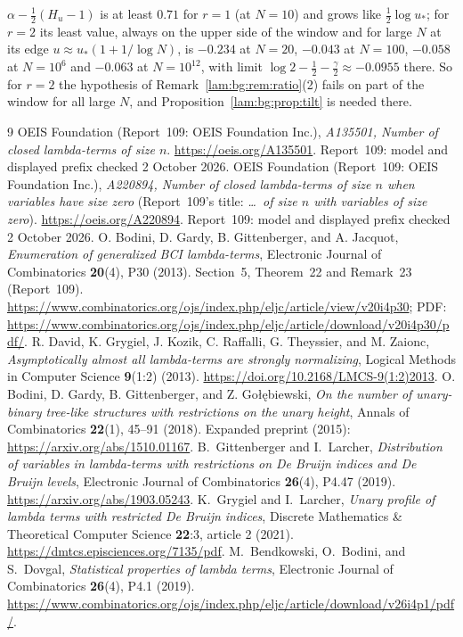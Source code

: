 \documentclass[11pt,a4paper]{article}
\numberwithin{equation}{section}
\theoremstyle{remark}
\begin{document}
$\alpha-\frac12(H_u-1)$ is at least $0.71$ for $r=1$ (at $N=10$) and grows like $\frac12\log u_*$; for $r=2$ its least value, always on the upper side of the window and for large $N$ at its edge $u\approx u_*(1+1/\log N)$, is $-0.234$ at $N=20$, $-0.043$ at $N=100$, $-0.058$ at $N=10^6$ and $-0.063$ at $N=10^{12}$, with limit $\log2-\frac12-\frac\gamma2\approx-0.0955$ there. So for $r=2$ the hypothesis of Remark~\ref{lam:bg:rem:ratio}(2) fails on part of the window for all large $N$, and Proposition~\ref{lam:bg:prop:tilt} is needed there.

\clearpage
\begin{thebibliography}{9}
 OEIS Foundation (Report~109: OEIS Foundation Inc.), \emph{A135501, Number of closed lambda-terms of size $n$}. \url{https://oeis.org/A135501}. Report~109: model and displayed prefix checked 2 October 2026.
 OEIS Foundation (Report~109: OEIS Foundation Inc.), \emph{A220894, Number of closed lambda-terms of size $n$ when variables have size zero} (Report~109's title: \emph{\ldots\ of size $n$ with variables of size zero}). \url{https://oeis.org/A220894}. Report~109: model and displayed prefix checked 2 October 2026.
 O. Bodini, D. Gardy, B. Gittenberger, and A. Jacquot, \emph{Enumeration of generalized BCI lambda-terms}, Electronic Journal of Combinatorics \textbf{20}(4), P30 (2013). Section~5, Theorem~22 and Remark~23 (Report~109). \url{https://www.combinatorics.org/ojs/index.php/eljc/article/view/v20i4p30}; PDF: \url{https://www.combinatorics.org/ojs/index.php/eljc/article/download/v20i4p30/pdf/}.
 R. David, K. Grygiel, J. Kozik, C. Raffalli, G. Theyssier, and M. Zaionc, \emph{Asymptotically almost all lambda-terms are strongly normalizing}, Logical Methods in Computer Science \textbf{9}(1:2) (2013). \url{https://doi.org/10.2168/LMCS-9(1:2)2013}.
 O. Bodini, D. Gardy, B. Gittenberger, and Z. Go\l\k{e}biewski, \emph{On the number of unary-binary tree-like structures with restrictions on the unary height}, Annals of Combinatorics \textbf{22}(1), 45--91 (2018). Expanded preprint (2015): \url{https://arxiv.org/abs/1510.01167}.
 B.~Gittenberger and I.~Larcher, \emph{Distribution of variables in lambda-terms with restrictions on De Bruijn indices and De Bruijn levels}, Electronic Journal of Combinatorics \textbf{26}(4), P4.47 (2019). \url{https://arxiv.org/abs/1903.05243}.
 K.~Grygiel and I.~Larcher, \emph{Unary profile of lambda terms with restricted De Bruijn indices}, Discrete Mathematics \& Theoretical Computer Science \textbf{22}:3, article 2 (2021). \url{https://dmtcs.episciences.org/7135/pdf}.
 M.~Bendkowski, O.~Bodini, and S.~Dovgal, \emph{Statistical properties of lambda terms}, Electronic Journal of Combinatorics \textbf{26}(4), P4.1 (2019). \url{https://www.combinatorics.org/ojs/index.php/eljc/article/download/v26i4p1/pdf/}.
\end{thebibliography}
\end{document}
